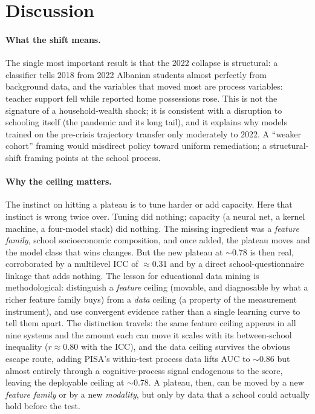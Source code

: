 \section{Discussion}
\label{sec:discussion}

\paragraph{What the shift means.}
The single most important result is that the 2022 collapse is structural: a classifier
tells 2018 from 2022 Albanian students almost perfectly from background data, and the
variables that moved most are process variables: teacher support fell while
reported home possessions rose. This is not the signature of a household-wealth shock;
it is consistent with a disruption to schooling itself (the pandemic and its long
tail), and it explains why models trained on the pre-crisis trajectory transfer only
moderately to 2022. A ``weaker cohort'' framing would misdirect policy toward
uniform remediation; a structural-shift framing points at the school process.

\paragraph{Why the ceiling matters.}
The instinct on hitting a plateau is to tune harder or add capacity. Here that instinct
is wrong twice over. Tuning did nothing; capacity (a neural net, a kernel machine, a
four-model stack) did nothing. The missing ingredient was a \emph{feature family}, school
socioeconomic composition, and once added, the plateau moves and the model
class that wins changes. But the new plateau at $\sim$0.78 is then real, corroborated
by a multilevel ICC of $\approx$0.31 and by a direct school-questionnaire linkage that
adds nothing. The lesson for educational data mining is methodological: distinguish a
\emph{feature} ceiling (movable, and diagnosable by what a richer feature family buys)
from a \emph{data} ceiling (a property of the measurement instrument), and use
convergent evidence rather than a single learning curve to tell them apart. The
distinction travels: the same feature ceiling appears in all nine systems and the amount
each can move it scales with its between-school inequality ($r\approx0.80$ with the
ICC), and the data ceiling survives the obvious escape route, adding PISA's
within-test process data lifts AUC to $\sim$0.86 but almost entirely through a
cognitive-process signal endogenous to the score, leaving the deployable ceiling at
$\sim$0.78. A plateau, then, can be moved by a new \emph{feature family} or by a new
\emph{modality}, but only by data that a school could actually hold before the test.


